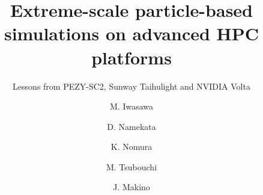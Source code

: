 \def\araa{Annual Review of Astronomy and Astrophysics }
\def\aap{Astronomy and Astrophysics }
\def\aj{The Astronomical Journal }
\def\apj{The Astrophysical Journal }
\def\APJ{The Astrophysical Journal }
\def\apjl{The Astrophysical Journal Letters }
\def\apjs{The Astrophysical Journal Supplement Series }
\def\apss{Astrophysics and Space Science }
\def\ajl{The Astronomical Journal }
\def\pasj{Publications of the Astronomical Society of Japan }
\def\mn{Monthly Notices of Royal Astronomical Society }
\def\MN{Monthly Notices of Royal Astronomical Society  }
\def\mnras{Monthly Notices of Royal Astronomical Society }
\def\nat{Nature }
\def\jcp{Journal of Computational Physics }
\def\etal{{\frenchspacing\it et al.}}
\def \K         {{\rm\,K}}
\def \Msun      {{\rm\,M}_{\odot}}
\def \Lsun      {{\rm\,L}_{\odot}}
\def \kmsmpc    {{\rm\,km\ s^{-1}\ Mpc^{-1}}}
\def \kms       {{\rm\,km\ s^{-1}}}
\def \mpc       {{\rm\,Mpc}}
\def \hmpc      {{\rm\,h^{-1}\,Mpc}}
\def \yr        {{\rm\,yr}}
\def \kpc       {{\rm\,kpc}}
\def \pc        {{\rm\,pc}}
\def \cc        {{\rm\,cm^{-3}}}
\def \kev       {{\rm\,keV}}
\def \erg       {{\rm\,erg}}
\def \myr       {{\rm\,Myr}}
\def \s         {{\rm\,s}}



\title{Extreme-scale particle-based simulations on advanced HPC platforms
}
\subtitle{Lessons from PEZY-SC2, Sunway Taihulight and NVIDIA Volta}


\author{M. Iwasawa\and D. Namekata \and K. Nomura \and M. Tsubouchi \and J. Makino}




